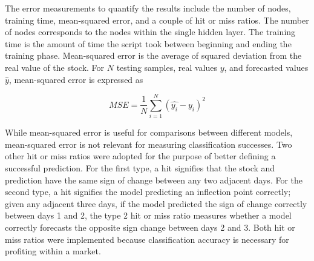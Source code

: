 \documentclass{ncjms}
\begin{document}
	\begin{table}
	\caption{Results: Extreme Learning Machine}
	\end{table}

	The error measurements to quantify the results include the number of nodes, training time, mean-squared error, and a couple of hit or miss ratios.
	The number of nodes corresponds to the nodes within the single hidden layer.
	The training time is the amount of time the script took between beginning and ending the training phase.
	Mean-squared error is the average of squared deviation from the real value of the stock.
	For $N$ testing samples, real values $y$, and forecasted values $\hat{y}$, mean-squared error is expressed as

	\begin{equation}
		MSE=\dfrac{1}{N}\sum_{i=1}^{N} (\hat{y_i} - y_i)^2
	\end{equation}

	While mean-squared error is useful for comparisons between different models, mean-squared error is not relevant for measuring classification successes.
	Two other hit or miss ratios were adopted for the purpose of better defining a successful prediction.
	For the first type, a hit signifies that the stock and prediction have the same sign of change between any two adjacent days.
	For the second type, a hit signifies the model predicting an inflection point correctly; given any adjacent three days, if the model predicted the sign of change correctly between days 1 and 2, the type 2 hit or miss ratio measures whether a model correctly forecasts the opposite sign change between days 2 and 3.
	Both hit or miss ratios were implemented because classification accuracy is necessary for profiting within a market.
\end{document}
